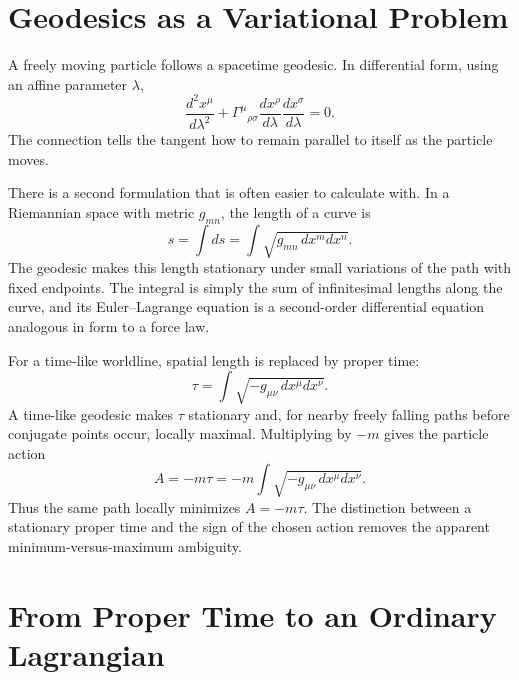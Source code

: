 \section{Geodesics as a Variational Problem}

A freely moving particle follows a spacetime geodesic.  In differential form,
using an affine parameter \(\lambda\),
\begin{equation}
\frac{d^2x^\mu}{d\lambda^2}
+\Gamma^\mu{}_{\rho\sigma}
\frac{dx^\rho}{d\lambda}
\frac{dx^\sigma}{d\lambda}=0.
\label{eq:l5-geodesic}
\end{equation}
The connection tells the tangent how to remain parallel to itself as the
particle moves.

There is a second formulation that is often easier to calculate with.  In a
Riemannian space with metric \(g_{mn}\), the length of a curve is
\begin{equation}
s=\int ds
=\int\sqrt{g_{mn}\,dx^m dx^n}.
\label{eq:l5-spatial-length}
\end{equation}
The geodesic makes this length stationary under small variations of the path
with fixed endpoints.  The integral is simply the sum of infinitesimal lengths
along the curve, and its Euler--Lagrange equation is a second-order
differential equation analogous in form to a force law.

For a time-like worldline, spatial length is replaced by proper time:
\begin{equation}
\tau
=\int\sqrt{-g_{\mu\nu}\,dx^\mu dx^\nu}.
\label{eq:l5-proper-time-functional}
\end{equation}
A time-like geodesic makes \(\tau\) stationary and, for nearby freely falling
paths before conjugate points occur, locally maximal.  Multiplying by
\(-m\) gives the particle action
\begin{equation}
A=-m\tau
=-m\int\sqrt{-g_{\mu\nu}\,dx^\mu dx^\nu}.
\label{eq:l5-particle-action}
\end{equation}
Thus the same path locally minimizes \(A=-m\tau\).  The distinction between a
stationary proper time and the sign of the chosen action removes the apparent
minimum-versus-maximum ambiguity.

\section{From Proper Time to an Ordinary Lagrangian}

